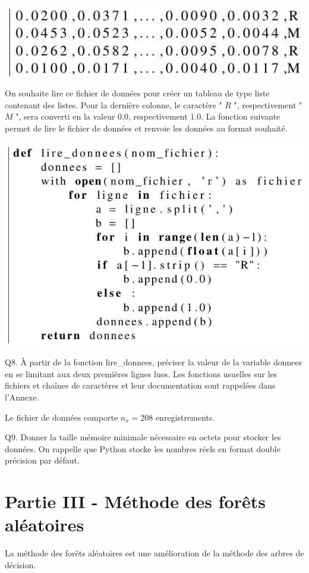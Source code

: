 \documentclass[10pt]{article}
\begin{document}
\includegraphics[max width=\textwidth]{2022_02_02_1af495ea60fb42b668bfg-07}

On souhaite lire ce fichier de données pour créer un tableau de type liste contenant des listes. Pour la dernière colonne, le caractère " $R$ ", respectivement " $M$ ", sera converti en la valeur $0.0$, respectivement 1.0. La fonction suivante permet de lire le fichier de données et renvoie les données au format souhaité.

\includegraphics[max width=\textwidth]{2022_02_02_1af495ea60fb42b668bfg-07(1)}

Q8. À partir de la fonction lire\_donnees, préciser la valeur de la variable donnees en se limitant aux deux premières lignes lues. Les fonctions usuelles sur les fichiers et chaînes de caractères et leur documentation sont rappelées dans l'Annexe.

Le fichier de données comporte $n_{x}=208$ enregistrements.

Q9. Donner la taille mémoire minimale nécessaire en octets pour stocker les données. On rappelle que Python stocke les nombres réels en format double précision par défaut.

\section{Partie III - Méthode des forêts aléatoires}
La méthode des forêts aléatoires est une amélioration de la méthode des arbres de décision.
\end{document}
